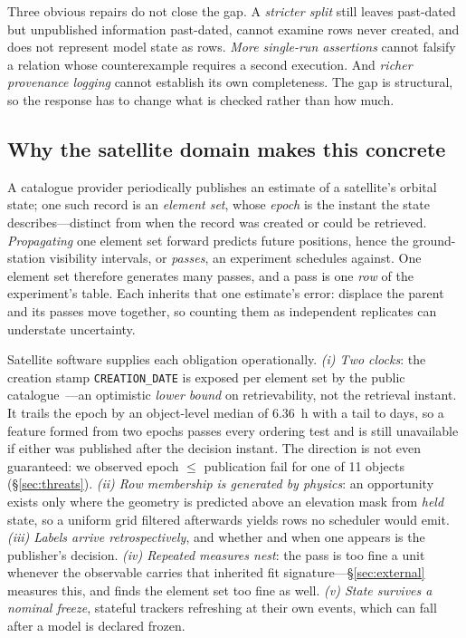 \documentclass[conference]{IEEEtran}
\newcommand{\artv}[2]{#2}
\begin{document}
Three obvious repairs do not close the gap. A \emph{stricter split} still leaves past-dated but
unpublished information past-dated, cannot examine rows never created, and does not represent model
state as rows. \emph{More single-run assertions} cannot falsify a relation whose counterexample
requires a second execution. And \emph{richer provenance logging} cannot establish its own
completeness. The gap is structural, so the response has to change what is checked rather than how
much.

\subsection{Why the satellite domain makes this concrete}
\label{sec:whysat}

A catalogue provider periodically publishes an estimate of a satellite's orbital state; one such
record is an \emph{element set}, whose \emph{epoch} is the instant the state describes---distinct
from when the record was created or could be retrieved. \emph{Propagating} one element set forward
predicts future positions, hence the ground-station visibility intervals, or \emph{passes}, an
experiment schedules against. One element set therefore generates many passes, and a pass is one
\emph{row} of the experiment's table. Each inherits that one estimate's error: displace the parent
and its passes move together, so counting them as independent replicates can understate
uncertainty.

Satellite software supplies each obligation operationally. \emph{(i) Two clocks}: the creation stamp
\texttt{CREATION\_DATE} is exposed per element set by the public
catalogue~\cite{ccsds502omm,spacetrackgp}---an optimistic \emph{lower bound} on retrievability, not
the retrieval instant. It trails the epoch by an object-level median of
\qty{\artv{lag_object_median_h}{6.36}}{\hour} with a tail to days, so a feature formed from two
epochs passes every ordering test and is still unavailable if either was published after the
decision instant. The direction is not even guaranteed: we observed epoch $\le$ publication fail for
\artv{timing_outlier_objects}{one} of \artv{lag_objects}{\num{11}} objects (\S\ref{sec:threats}).
\emph{(ii) Row membership is generated by physics}: an opportunity exists only where the geometry is
predicted above an elevation mask from \emph{held} state, so a uniform grid filtered afterwards yields
rows no scheduler would emit. \emph{(iii) Labels arrive retrospectively}, and whether and when one
appears is the publisher's decision. \emph{(iv) Repeated measures nest}: the pass is too fine a
unit whenever the observable carries that inherited fit signature---\S\ref{sec:external}
measures this, and finds the element set too fine as well. \emph{(v) State survives
a nominal freeze}, stateful trackers refreshing at their own events, which can fall after a model is
declared frozen.
\end{document}

